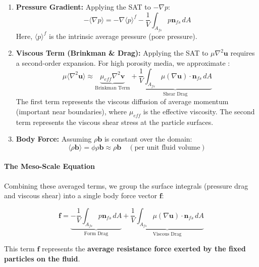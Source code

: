 \begin{enumerate}
    \item \textbf{Pressure Gradient:} Applying the SAT to $-\nabla p$:
    \begin{equation}
        -\langle \nabla p \rangle = -\nabla \langle p \rangle^f - \frac{1}{V} \int_{A_{fs}} p \mathbf{n}_{fs} \, dA
    \end{equation}
    Here, $\langle p \rangle^f$ is the intrinsic average pressure (pore pressure).
    \item \textbf{Viscous Term (Brinkman \& Drag):} Applying the SAT to $\mu \nabla^2 \mathbf{u}$ requires a second-order expansion.
    For high porosity media, we approximate \cite{brinkman1949calculation}:
    \begin{equation}
        \mu \langle \nabla^2 \mathbf{u} \rangle \approx \underbrace{\mu_{eff} \nabla^2 \mathbf{v}}_{\text{Brinkman Term}} + \underbrace{\frac{1}{V} \int_{A_{fs}} \mu (\nabla \mathbf{u}) \cdot \mathbf{n}_{fs} \, dA}_{\text{Shear Drag}}
    \end{equation}
    The first term represents the viscous diffusion of average momentum (important near boundaries), where $\mu_{eff}$ is the effective viscosity.
    The second term represents the viscous shear stress at the particle surfaces.
    \item \textbf{Body Force:} Assuming $\rho \mathbf{b}$ is constant over the domain:
    \begin{equation}
        \langle \rho \mathbf{b} \rangle = \phi \rho \mathbf{b} \approx \rho \mathbf{b} \quad (\text{per unit fluid volume})
    \end{equation}
\end{enumerate}

\paragraph{The Meso-Scale Equation}
Combining these averaged terms, we group the surface integrals (pressure drag and viscous shear) into a single body force vector $\mathbf{f}$:

\begin{equation}
    \mathbf{f} = \underbrace{-\frac{1}{V} \int_{A_{fs}} p \mathbf{n}_{fs} \, dA}_{\text{Form Drag}} + \underbrace{\frac{1}{V} \int_{A_{fs}} \mu (\nabla \mathbf{u}) \cdot \mathbf{n}_{fs} \, dA}_{\text{Viscous Drag}}
\end{equation}

This term $\mathbf{f}$ represents the \textbf{average resistance force exerted by the fixed particles on the fluid}.

